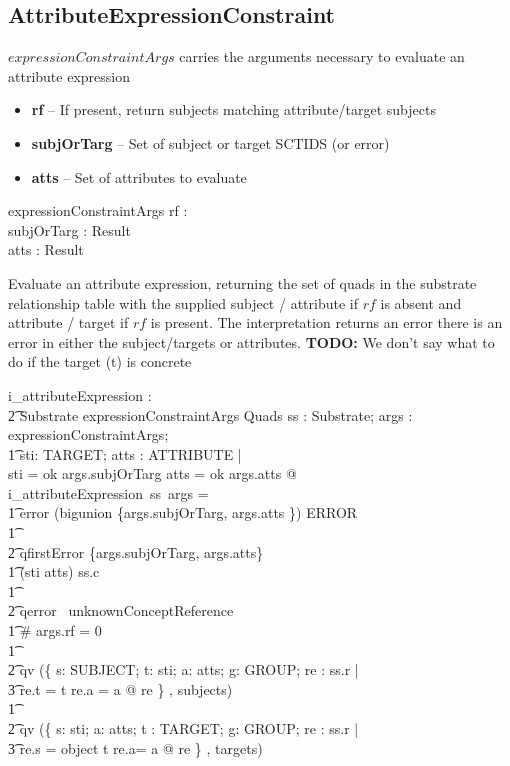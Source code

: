 \documentclass{article}
\begin{document}
\subsection{AttributeExpressionConstraint}
$expressionConstraintArgs$ carries the arguments necessary to evaluate an attribute expression
\begin{itemize}[noitemsep,nolistsep]
\item{\textbf{rf}}  -- If present, return subjects matching attribute/target subjects
\item{\textbf{subjOrTarg}} -- Set of subject or target SCTIDS (or error)
\item{\textbf{atts}}  -- Set of attributes to evaluate
\end{itemize}

\begin{schema}{expressionConstraintArgs}
   rf : \optional[reverseFlag] \\
   subjOrTarg : Result \\
   atts : Result \\
\end{schema}

Evaluate an attribute expression, returning the set of quads in the substrate relationship table
with the supplied subject / attribute if $rf$ is
absent and attribute / target if $rf$ is present.  The interpretation returns an error there is
an error in either the subject/targets or attributes.
\textbf{TODO:}  We don't say what to do if the target (t) is concrete
\begin{gendef}
   i\_attributeExpression : \\ 
\t2 Substrate \fun expressionConstraintArgs \fun Quads
\where
   \forall ss : Substrate;  args : expressionConstraintArgs; \\
\t1 sti: \power TARGET; atts : \power ATTRIBUTE | \\
   sti = ok \inv args.subjOrTarg \land atts = ok \inv args.atts @ \\
   i\_attributeExpression~ss~args = \\
\t1 \IF error \inv (bigunion \{args.subjOrTarg, args.atts \}) \in ERROR \\
\t1 \THEN \\
\t2 qfirstError \{args.subjOrTarg, args.atts\} \\
\t1 \ELSE \IF \lnot (sti \cup  atts) \subseteq ss.c \\
\t1 \THEN \\
\t2 qerror~  unknownConceptReference \\
\t1 \ELSE \IF \# args.rf = 0 \\
\t1 \THEN \\
\t2 qv (\{ s: SUBJECT; t: sti; a: atts; g: GROUP; re : ss.r |\\
\t3 re.t = t \land re.a = a @ re \} , subjects) \\
\t1 \ELSE \\
\t2 qv  (\{ s: sti; a: atts; t : TARGET; g: GROUP; re : ss.r | \\
\t3 re.s = object \inv t \land re.a= a @ re \} , targets) \\
\end{gendef}
\end{document}
